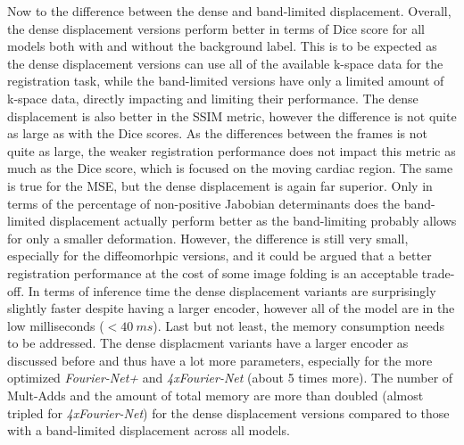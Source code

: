 \documentclass[english,version-2022-01]{uzl-thesis} %
\begin{document}
Now to the difference between the dense and band-limited displacement. Overall, the dense displacement versions perform better in terms of Dice score for all models both with and without the background label. This is to be expected as the dense displacement versions can use all of the available k-space data for the registration task, while the band-limited versions have only a limited amount of k-space data, directly impacting and limiting their performance. The dense displacement is also better in the SSIM metric, however the difference is not quite as large as with the Dice scores. As the differences between the frames is not quite as large, the weaker registration performance does not impact this metric as much as the Dice score, which is focused on the moving cardiac region. The same is true for the MSE, but the dense displacement is again far superior. Only in terms of the percentage of non-positive Jabobian determinants does the band-limited displacement actually perform better as the band-limiting probably allows for only a smaller deformation. However, the difference is still very small, especially for the diffeomorhpic versions, and it could be argued that a better registration performance at the cost of some image folding is an acceptable trade-off. In terms of inference time the dense displacement variants are surprisingly slightly faster despite having a larger encoder, however all of the model are in the low milliseconds ($<40~ms$). Last but not least, the memory consumption needs to be addressed. The dense displacment variants have a larger encoder as discussed before and thus have a lot more parameters, especially for the more optimized \emph{Fourier-Net+} and \emph{4xFourier-Net} (about 5 times more). The number of Mult-Adds and the amount of total memory are more than doubled (almost tripled for \emph{4xFourier-Net}) for the dense displacement versions compared to those with a band-limited displacement across all models.
\end{document}
